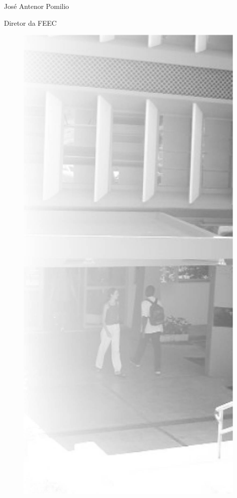 José Antenor Pomilio

Diretor da FEEC


\begin{figure}[t]
    \centering
    \includegraphics[width=.35\textwidth]{img/ola_mundo/feec.jpg}
\end{figure}